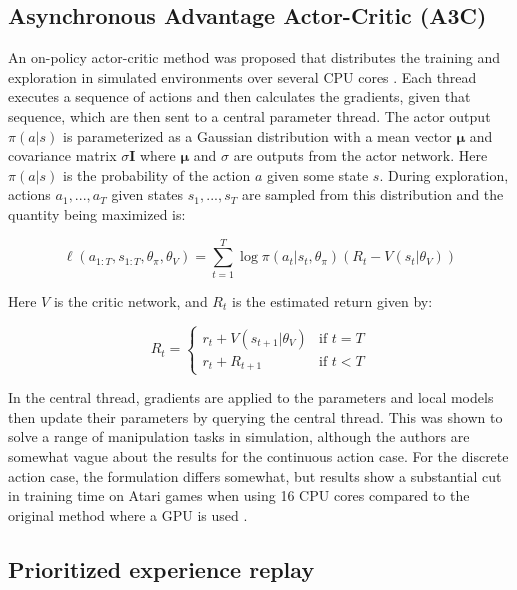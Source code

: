 \subsection{Asynchronous Advantage Actor-Critic (A3C)}

An on-policy actor-critic method was proposed that distributes the training
and exploration in simulated environments over several CPU cores
\cite{mnih2016asynchronous}. Each thread executes a sequence of actions and
then calculates the gradients, given that sequence, which are then sent to a
central parameter thread. The actor output $\pi(a|s)$ is parameterized as a Gaussian distribution
with a mean vector $\mathbf{\mu}$ and covariance matrix $\sigma\mathbf{I}$ where $\mathbf{\mu}$
and $\sigma$ are outputs from the actor network. Here $\pi(a|s)$ is the probability of the action $a$ given
some state $s$.
During exploration, actions $a_1, ..., a_T$ given states $s_1, ..., s_T$ are sampled from this distribution and the quantity being maximized
is:

\begin{equation}
    \ell(a_{1:T}, s_{1:T}, \theta_\pi, \theta_V) = \sum_{t=1}^T \log \pi (a_t|s_t, \theta_\pi) (R_t - V(s_t|\theta_V))
\end{equation}

Here $V$ is the critic network, and $R_t$ is the estimated return given by:

\begin{equation}
    R_t =
    \begin{cases}
        r_t + V(s_{t+1}|\theta_V) & \text{if } t = T\\
        r_t + R_{t+1} & \text{if } t < T
    \end{cases}
\end{equation}

In the central thread, gradients are applied to the parameters and local models
then update their parameters by querying the central thread. This was shown to
solve a range of manipulation tasks in simulation, although the authors are
somewhat vague about the results for the continuous action case. For the
discrete action case, the formulation differs somewhat, but results show a
substantial cut in training time on Atari games when using 16 CPU cores
compared to the original method where a GPU is used \cite{mnih2013playing}.

\subsection{Prioritized experience replay}
\label{sec:prio_sampling}

